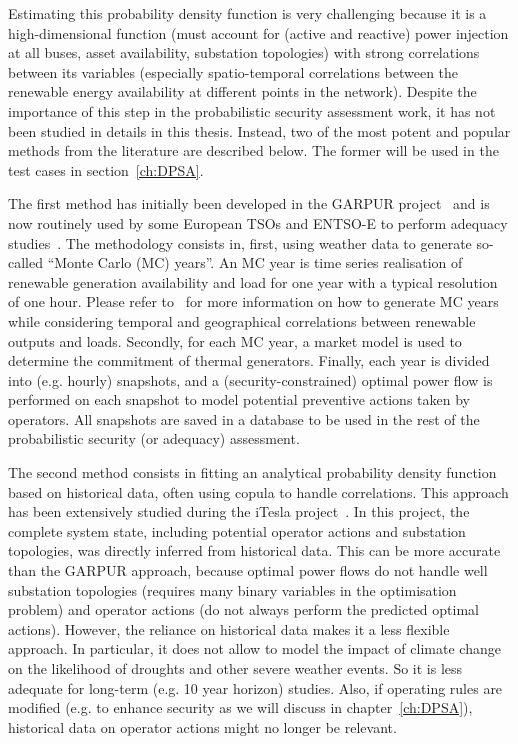 Estimating this probability density function is very challenging because it is a high-dimensional function (must account for (active and reactive) power injection at all buses, asset availability, substation topologies) with strong correlations between its variables (especially spatio-temporal correlations between the renewable energy availability at different points in the network). Despite the importance of this step in the probabilistic security assessment work, it has not been studied in details in this thesis. Instead, two of the most potent and popular methods from the literature are described below. The former will be used in the test cases in section~\ref{ch:DPSA}.

The first method has initially been developed in the GARPUR project~\cite{StrathElia, StrathGARPUR} and is now routinely used by some European TSOs and ENTSO-E to perform adequacy studies~\cite{ACER_MC_year, EliaAdequacy}. The methodology consists in, first, using weather data to generate so-called ``Monte Carlo (MC) years''. An MC year is time series realisation of renewable generation availability and load for one year with a typical resolution of one hour. Please refer to~\cite{StrathGARPUR} for more information on how to generate MC years while considering temporal and geographical correlations between renewable outputs and loads. Secondly, for each MC year, a market model is used to determine the commitment of thermal generators. Finally, each year is divided into (e.g. hourly) snapshots, and a (security-constrained) optimal power flow is performed on each snapshot to model potential preventive actions taken by operators. All snapshots are saved in a database to be used in the rest of the probabilistic security (or adequacy) assessment. %

The second method consists in fitting an analytical probability density function based on historical data, often using copula to handle correlations. This approach has been extensively studied during the iTesla project~\cite{KonstantelosCopulas, EurostagHPC}. In this project, the complete system state, including potential operator actions and substation topologies, was directly inferred from historical data. This can be more accurate than the GARPUR approach, because optimal power flows do not handle well substation topologies (requires many binary variables in the optimisation problem) and operator actions (do not always perform the predicted optimal actions). However, the reliance on historical data makes it a less flexible approach. In particular, it does not allow to model the impact of climate change on the likelihood of droughts and other severe weather events. So it is less adequate for long-term (e.g. 10 year horizon) studies. Also, if operating rules are modified (e.g. to enhance security as we will discuss in chapter~\ref{ch:DPSA}), historical data on operator actions might no longer be relevant.


